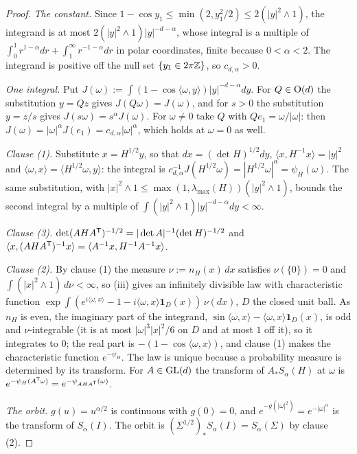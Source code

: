\begin{proof}
\leanok
\emph{The constant.} Since $1 - \cos y_1 \le \min(2, y_1^2/2) \le 2(|y|^2 \wedge 1)$, the integrand is
at most $2(|y|^2 \wedge 1)|y|^{-d-\alpha}$, whose integral is a multiple of
$\int_0^1 r^{1-\alpha}dr + \int_1^\infty r^{-1-\alpha}dr$ in polar coordinates, finite because
$0 < \alpha < 2$. The integrand is positive off the null set $\{y_1 \in 2\pi\mathbb{Z}\}$, so
$c_{d,\alpha} > 0$.

\emph{One integral.} Put $J(\omega) := \int(1 - \cos\langle\omega,y\rangle)|y|^{-d-\alpha}dy$. For
$Q \in \mathrm{O}(d)$ the substitution $y = Qz$ gives $J(Q\omega) = J(\omega)$, and for $s > 0$ the
substitution $y = z/s$ gives $J(s\omega) = s^\alpha J(\omega)$. For $\omega \ne 0$ take $Q$ with
$Qe_1 = \omega/|\omega|$: then $J(\omega) = |\omega|^\alpha J(e_1) = c_{d,\alpha}|\omega|^\alpha$, which
holds at $\omega = 0$ as well.

\emph{Clause (1).} Substitute $x = H^{1/2}y$, so that $dx = (\det H)^{1/2}dy$,
$\langle x,H^{-1}x\rangle = |y|^2$ and $\langle\omega,x\rangle = \langle H^{1/2}\omega,y\rangle$:
the integral is $c_{d,\alpha}^{-1}J(H^{1/2}\omega) = |H^{1/2}\omega|^\alpha = \psi_H(\omega)$. The
same substitution, with $|x|^2 \wedge 1 \le \max(1,\lambda_{\max}(H))(|y|^2 \wedge 1)$, bounds the
second integral by a multiple of $\int(|y|^2 \wedge 1)|y|^{-d-\alpha}dy < \infty$.

\emph{Clause (3).} $\det(AHA^{\mathsf{T}})^{-1/2} = |\det A|^{-1}(\det H)^{-1/2}$ and
$\langle x,(AHA^{\mathsf{T}})^{-1}x\rangle = \langle A^{-1}x,H^{-1}A^{-1}x\rangle$.

\emph{Clause (2).} By clause (1) the measure $\nu := n_H(x)\,dx$ satisfies $\nu(\{0\}) = 0$ and
$\int(|x|^2 \wedge 1)\,d\nu < \infty$, so (iii) gives an infinitely divisible law with
characteristic function $\exp\int(e^{i\langle\omega,x\rangle} - 1 - i\langle\omega,x\rangle\mathbf
1_D(x))\,\nu(dx)$, $D$ the closed unit ball. As $n_H$ is even, the imaginary part of the integrand,
$\sin\langle\omega,x\rangle - \langle\omega,x\rangle\mathbf 1_D(x)$, is odd and $\nu$-integrable
(it is at most $|\omega|^3|x|^2/6$ on $D$ and at most $1$ off it), so it integrates to $0$; the real
part is $-(1 - \cos\langle\omega,x\rangle)$, and clause (1) makes the characteristic function
$e^{-\psi_H}$. The law is unique because a probability measure is determined by its transform. For
$A \in \mathrm{GL}(d)$ the transform of $A_*S_\alpha(H)$ at $\omega$ is
$e^{-\psi_H(A^{\mathsf{T}}\omega)} = e^{-\psi_{AHA^{\mathsf{T}}}(\omega)}$.

\emph{The orbit.} $g(u) = u^{\alpha/2}$ is continuous with $g(0) = 0$, and
$e^{-g(|\omega|^2)} = e^{-|\omega|^\alpha}$ is the transform of $S_\alpha(I)$. The orbit is
$(\Sigma^{1/2})_*S_\alpha(I) = S_\alpha(\Sigma)$ by clause (2).
\end{proof}


